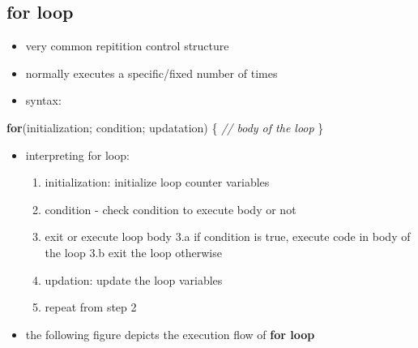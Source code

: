 \documentclass[11pt]{article}
\providecommand{\tightlist}{%
      \setlength{\itemsep}{0pt}\setlength{\parskip}{0pt}}
\newenvironment{Shaded}{}{}
\newcommand{\CommentTok}[1]{\textcolor[rgb]{0.38,0.63,0.69}{\textit{{#1}}}}
\newcommand{\NormalTok}[1]{{#1}}
\newcommand{\ControlFlowTok}[1]{\textcolor[rgb]{0.00,0.44,0.13}{\textbf{{#1}}}}
\newcommand{\OperatorTok}[1]{\textcolor[rgb]{0.40,0.40,0.40}{{#1}}}
\begin{document}
\hypertarget{for-loop}{%
\subsection{for loop}\label{for-loop}}

\begin{itemize}
\tightlist
\item
  very common repitition control structure
\item
  normally executes a specific/fixed number of times
\item
  syntax:
\end{itemize}

\begin{Shaded}
\begin{Highlighting}[]
    \ControlFlowTok{for}\OperatorTok{(}\NormalTok{initialization}\OperatorTok{;}\NormalTok{ condition}\OperatorTok{;}\NormalTok{ updatation}\OperatorTok{)} \OperatorTok{\{}
        \CommentTok{// body of the loop}
    \OperatorTok{\}}
\end{Highlighting}
\end{Shaded}

\begin{itemize}
\tightlist
\item
  interpreting for loop:

  \begin{enumerate}
  \def\labelenumi{\arabic{enumi}.}
  \tightlist
  \item
    initialization: initialize loop counter variables
  \item
    condition - check condition to execute body or not
  \item
    exit or execute loop body 3.a if condition is true, execute code in
    body of the loop 3.b exit the loop otherwise
  \item
    updation: update the loop variables
  \item
    repeat from step 2
  \end{enumerate}
\item
  the following figure depicts the execution flow of \textbf{for loop}
\end{itemize}
\end{document}

